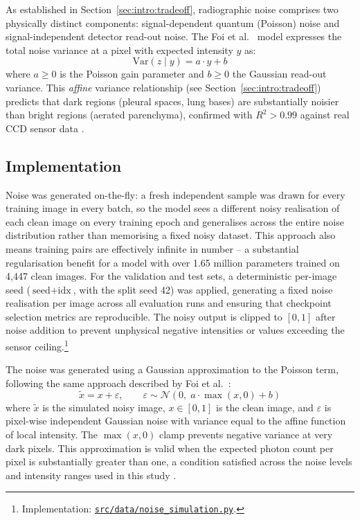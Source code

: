 \documentclass[12pt, a4paper, twoside, openright]{book}
\begin{document}
As established in Section~\ref{sec:intro:tradeoff}, radiographic noise comprises two physically distinct components: signal-dependent quantum (Poisson) noise and signal-independent detector read-out noise. The Foi et al.\ \cite{foi_practical_2008} model expresses the total noise variance at a pixel with expected intensity $y$ as:
\begin{equation}
\label{eq:methods:foi}
\mathrm{Var}(z \mid y) = a \cdot y + b
\end{equation}
where $a \geq 0$ is the Poisson gain parameter and $b \geq 0$ the Gaussian read-out variance. This \emph{affine} variance relationship (see Section~\ref{sec:intro:tradeoff}) predicts that dark regions (pleural spaces, lung bases) are substantially noisier than bright regions (aerated parenchyma), confirmed with $R^2 > 0.99$ against real CCD sensor data \cite{foi_practical_2008}.

\subsection{Implementation}
\label{sec:methods:noise:implementation}

Noise was generated on-the-fly: a fresh independent sample was drawn for every training image in every batch, so the model sees a different noisy realisation of each clean image on every training epoch and generalises across the entire noise distribution rather than memorising a fixed noisy dataset. This approach also means training pairs are effectively infinite in number -- a substantial regularisation benefit for a model with over 1.65 million parameters trained on 4,447 clean images. For the validation and test sets, a deterministic per-image seed ($\text{seed} + \text{idx}$, with the split seed 42) was applied, generating a fixed noise realisation per image across all evaluation runs and ensuring that checkpoint selection metrics are reproducible. The noisy output is clipped to $[0,1]$ after noise addition to prevent unphysical negative intensities or values exceeding the sensor ceiling.\footnote{Implementation: \href{https://github.com/teklesam/ppva_hformer_codebase/blob/main/src/data/noise_simulation.py}{\texttt{src/data/noise\_simulation.py}}.}

The noise was generated using a Gaussian approximation to the Poisson term, following
the same approach described by Foi et al.\ \cite{foi_practical_2008}:
\begin{equation}
\label{eq:methods:noise_impl}
\tilde{x} = x + \varepsilon, \qquad
\varepsilon \sim \mathcal{N}\!\left(0,\; a \cdot \max(x, 0) + b\right)
\end{equation}
where $\tilde{x}$ is the simulated noisy image, $x \in [0,1]$ is the clean image, and
$\varepsilon$ is pixel-wise independent Gaussian noise with variance equal to the affine
function of local intensity. The $\max(x, 0)$ clamp prevents negative variance at very dark
pixels. This approximation is valid when the expected photon count per pixel is substantially
greater than one, a condition satisfied across the noise levels and intensity ranges used in
this study \cite{foi_practical_2008}.
\end{document}
